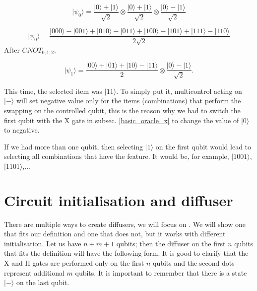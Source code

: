 \begin{equation}
|\psi_0\rangle = \frac{|0\rangle + |1\rangle}{\sqrt{2}} \otimes \frac{|0\rangle + |1\rangle}{\sqrt{2}} \otimes \frac{|0\rangle - |1\rangle}{\sqrt{2}}
\end{equation}

\begin{equation}
|\psi_0\rangle =  \frac{|000\rangle - |001\rangle +|010\rangle -|011\rangle +|100\rangle -|101\rangle + |111\rangle - |110\rangle}{2\sqrt{2}}
\end{equation}
After $CNOT_{0,1;2}$.

\begin{equation}
|\psi_1\rangle =  \frac{|00\rangle + |01\rangle + |10\rangle - |11\rangle }{2} \otimes \frac{|0\rangle - |1\rangle}{\sqrt{2}}.
\end{equation}

This time, the selected item was $|11\rangle$. To simply put it, multicontrol acting on $|-\rangle$ will set negative value only for the items (combinations) that perform the swapping on the controlled qubit, this is the reason why we had to switch the first qubit with the X gate in subsec. \ref{basic_oracle_x} to change the value of $|0\rangle$ to negative.

If we had more than one qubit, then selecting $|1\rangle$ on the first qubit would lead to selecting all combinations that have the feature. It would be, for example, $|1001\rangle$, $|1101\rangle$,...

\section{Circuit initialisation and diffuser}
There are multiple ways to create diffusers, we will focus on \cite{qc_grover_ibm}. We will show one that fits our definition and one that does not, but it works with different initialisation. Let us have $n+m+1$ qubits; then the diffuser on the first $n$ qubits that fits the definition will have the following form. It is good to clarify that the X and H gates are performed only on the first $n$ qubits and the second dots represent additional $m$ qubits. It is important to remember that there is a state $|-\rangle$ on the last qubit. 


